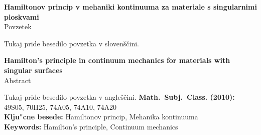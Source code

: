 \begin{center}
{\bf Hamiltonov princip v mehaniki kontinuuma za materiale s singularnimi ploskvami}\\[3mm]
{\sc Povzetek}
\end{center}
\textcolor[rgb]{1,0,0}{Tukaj pride besedilo povzetka v slovenščini.}
\vfill
\begin{center}
{\bf Hamilton's principle in continuum mechanics for materials with singular surfaces}\\[3mm]
{\sc Abstract}
\end{center}
\textcolor[rgb]{1,0,0}{Tukaj pride besedilo povzetka v angleščini.}
\vfill\noindent
{\bf Math.~Subj.~Class. (2010):} 49S05, 70H25, 74A05, 74A10, 74A20  \\[1mm]  
{\bf Klju"cne besede:} Hamiltonov princip, Mehanika kontinuuma \\[1mm]  
{\bf Keywords:} Hamilton's principle, Continuum mechanics